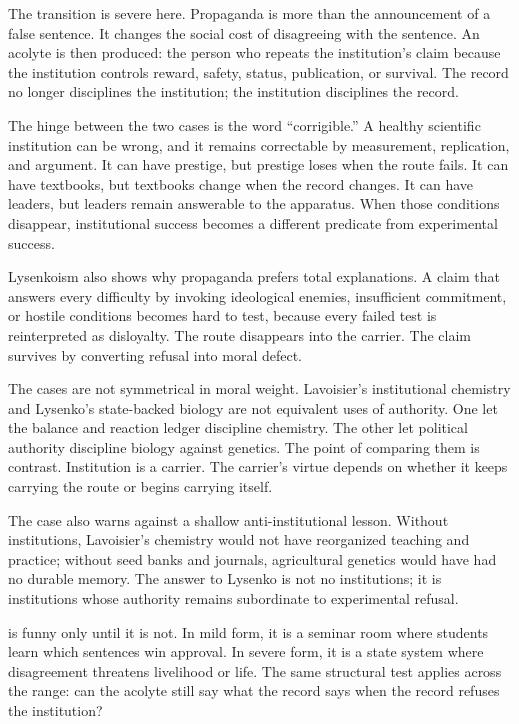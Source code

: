 The  transition is severe here. Propaganda
is more than the announcement of a false sentence. It changes the
social cost of disagreeing with the sentence. An acolyte is then
produced: the person who repeats the institution's claim because the
institution controls reward, safety, status, publication, or survival.
The record no longer disciplines the institution; the institution
disciplines the record.

The hinge between the two cases is the word ``corrigible.'' A healthy
scientific institution can be wrong, and it remains correctable by
measurement, replication, and argument. It can have prestige, but
prestige loses when the route fails. It can have textbooks, but textbooks
change when the record changes. It can have leaders, but leaders remain
answerable to the apparatus. When those conditions disappear,
institutional success becomes a different predicate from experimental
success.

Lysenkoism also shows why propaganda prefers total explanations. A claim
that answers every difficulty by invoking ideological enemies,
insufficient commitment, or hostile conditions becomes hard to test,
because every failed test is reinterpreted as disloyalty. The route
disappears into the carrier. The claim survives by converting refusal
into moral defect.

The cases are not symmetrical in moral weight. Lavoisier's institutional
chemistry and Lysenko's state-backed biology are not equivalent uses of
authority. One let the balance and reaction ledger discipline chemistry.
The other let political authority discipline biology against genetics.
The point of comparing them is contrast. Institution is a carrier. The
carrier's virtue depends on whether it keeps carrying the route or
begins carrying itself.

The case also warns against a shallow anti-institutional lesson. Without
institutions, Lavoisier's chemistry would not have reorganized teaching
and practice; without seed banks and journals, agricultural genetics
would have had no durable memory. The answer to Lysenko is not no
institutions; it is institutions whose authority remains subordinate to
experimental refusal.

 is funny only until it is not. In mild form, it is a
seminar room where students learn which sentences win approval. In
severe form, it is a state system where disagreement threatens
livelihood or life. The same structural test applies across the range:
can the acolyte still say what the record says when the record refuses
the institution?

